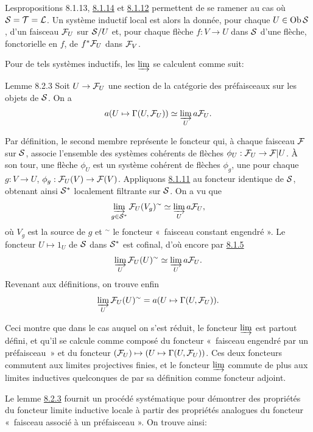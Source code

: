 \documentclass[10pt]{../fichiers-configuration-latex/smfart}
\begin{document}
Les\pageoriginale propositions 8.1.13,
\hyperref[V.prop8.1.14]{8.1.14} et \hyperref[V.prop8.1.12]{8.1.12} permettent de se ramener au
cas où ${\mathcal S} = {\mathcal T} = {\mathcal L}$. Un système inductif local est
alors la donnée, pour chaque $U \in \operatorname{Ob} {\mathcal S}$, d'un faisceau
${\mathcal F}_U$ sur ${\mathcal S}/U$ et, pour chaque flèche $f: V \to U$ dans ${\mathcal S}$
d'une flèche, fonctorielle en $f$, de $f^{\ast} {\mathcal F}_U$ dans
${\mathcal F}_V$.

Pour de tels systèmes inductifs, les $\varinjlim$ se calculent
comme suit:

\begin{enonce*}{Lemme 8.2.3}
Soit $U \to \Ff_U$ une section de la catégorie des
préfaisceaux sur les objets de ${\mathcal S}$. On a
$$
a(U \mapsto \Gamma(U, {\mathcal F}_U)) \simeq \varinjlim_{U} a {\mathcal F}_U{}.
$$
\end{enonce*}

Par définition, le second membre représente le foncteur qui, à
chaque faisceau ${\mathcal F}$ sur ${\mathcal S}$, associe l'ensemble des systèmes
cohérents de flèches $\phi_U : \Ff_U \to \Ff|U$. À son tour, une
flèche $\phi_U$ est un système cohérent de flèches $\phi_g$, une
pour chaque $g : V \to U$, $\phi_g : \Ff_U (V) \to \Ff(V)$.
Appliquons \hyperref[V.lem8.1.11]{8.1.11} au foncteur identique de ${\mathcal S}$,
obtenant ainsi ${\mathcal S}^{\ast}$ localement filtrante sur ${\mathcal S}$. On a vu
que
$$
\varinjlim_{g \in {\mathcal S}^{\ast}} {\mathcal F}_U(V_g)^{\sim} \simeq
\varinjlim_{U} a {\mathcal F}_U{},
$$
où $V_g$ est la source de $g$ et ${}^{\sim}$ le foncteur « faisceau
constant engendré ». Le foncteur $U \mapsto 1_U$ de ${\mathcal S}$ dans ${\mathcal S}^{\ast}$
est cofinal, d'où encore par \hyperref[V.prop8.1.5]{8.1.5}
$$
\varinjlim_{U} {\mathcal F}_U(U)^{\sim} \simeq
\varinjlim_{U} a {\mathcal F}_U{}.
$$
Revenant aux définitions, on trouve enfin
$$
\varinjlim_{U} {\mathcal F}_U(U)^{\sim} = a (U \mapsto \Gamma(U,
{\mathcal F}_U)){}.
$$

Ceci montre que dans le cas auquel on s'est réduit, le foncteur
$\varinjlim$ est partout défini, et qu'il se calcule comme
composé du foncteur « faisceau engendré par un préfaisceau » et du
foncteur $({\mathcal F}_U) \mapsto (U \mapsto \Gamma (U,
{\mathcal F}_U))$. Ces deux foncteurs commutent aux limites projectives
finies, et le foncteur $\varinjlim$ commute de plus aux
limites inductives quelconques de par sa définition comme foncteur
adjoint.

Le \pageoriginale lemme \hyperref[V.lem8.2.3]{8.2.3} fournit un procédé systématique pour
démontrer des propriétés du foncteur limite inductive locale à partir
des propriétés analogues du foncteur « faisceau associé à un
préfaisceau ». On trouve ainsi:
\end{document}
